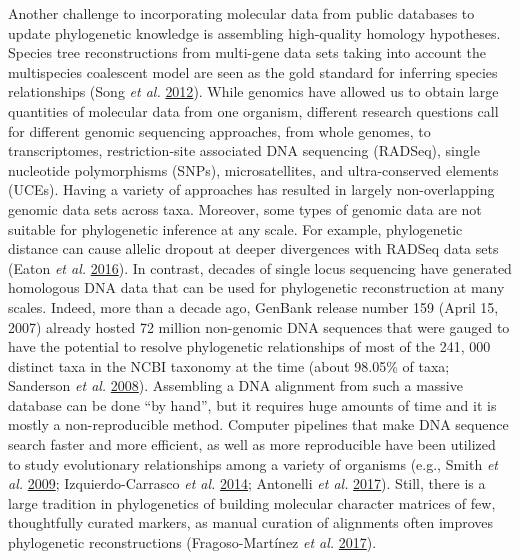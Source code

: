 \documentclass[]{article}
\begin{document}
Another challenge to incorporating molecular data from public databases to update phylogenetic knowledge is assembling high-quality homology hypotheses. Species tree reconstructions from multi-gene data sets taking into account the multispecies coalescent model are seen as the gold standard for inferring species relationships (Song \emph{et al.} \protect\hyperlink{ref-song2012resolving}{2012}).
While genomics have allowed us to obtain large quantities of molecular data from one organism, different research questions call for different genomic sequencing approaches, from whole genomes, to transcriptomes, restriction-site associated DNA sequencing (RADSeq), single nucleotide polymorphisms (SNPs), microsatellites, and ultra-conserved elements (UCEs).
Having a variety of approaches has resulted in largely non-overlapping genomic data sets across taxa. Moreover, some types of genomic data are not suitable for phylogenetic inference at any scale. For example, phylogenetic distance can cause allelic dropout at deeper divergences with RADSeq data sets (Eaton \emph{et al.} \protect\hyperlink{ref-eaton2016misconceptions}{2016}).
In contrast, decades of single locus sequencing have generated homologous DNA data
that can be used for phylogenetic reconstruction at many scales. Indeed, more than a decade ago, GenBank release number 159 (April 15, 2007) already hosted 72 million non-genomic DNA sequences that were gauged to have the potential to resolve phylogenetic relationships of most of the 241, 000 distinct taxa in the NCBI taxonomy at the time (about 98.05\% of taxa; Sanderson \emph{et al.} \protect\hyperlink{ref-sanderson2008phylota}{2008}). Assembling a DNA alignment from such a massive database can be done ``by hand'', but it requires huge amounts of time and it is mostly a non-reproducible method. Computer pipelines that make DNA sequence search faster and more efficient, as well as more reproducible have been utilized to study evolutionary relationships among a variety of organisms (e.g., Smith \emph{et al.} \protect\hyperlink{ref-smith2009mega}{2009}; Izquierdo-Carrasco \emph{et al.} \protect\hyperlink{ref-izquierdo2014pumper}{2014}; Antonelli \emph{et al.} \protect\hyperlink{ref-antonelli2017toward}{2017}).
Still, there is a large tradition in phylogenetics of building molecular character matrices of few, thoughtfully curated markers, as manual curation of alignments often improves phylogenetic reconstructions (Fragoso-Martínez \emph{et al.} \protect\hyperlink{ref-fragoso2017pilot}{2017}).
\end{document}
